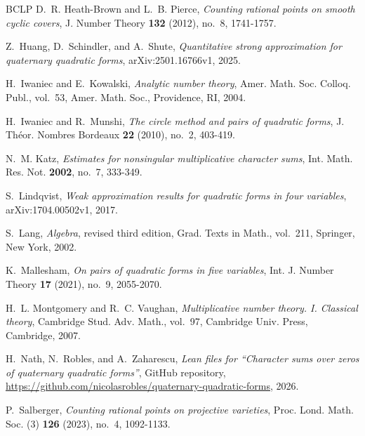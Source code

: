 \documentclass[11pt]{amsart}
\numberwithin{equation}{section}
\numberwithin{figure}{section}
\theoremstyle{definition}
\begin{document}
\begin{thebibliography}{BCLP}
D.~R. Heath-Brown and L.~B. Pierce,
\emph{Counting rational points on smooth cyclic covers},
J. Number Theory \textbf{132} (2012), no.~8, 1741-1757.

Z.~Huang, D.~Schindler, and A.~Shute,
\emph{Quantitative strong approximation for quaternary quadratic forms},
arXiv:2501.16766v1, 2025.

H.~Iwaniec and E.~Kowalski,
\emph{Analytic number theory},
Amer. Math. Soc. Colloq. Publ., vol.~53, Amer. Math. Soc., Providence, RI, 2004.

H.~Iwaniec and R.~Munshi,
\emph{The circle method and pairs of quadratic forms},
J. Th\'eor. Nombres Bordeaux \textbf{22} (2010), no.~2, 403-419.

N.~M. Katz,
\emph{Estimates for nonsingular multiplicative character sums},
Int. Math. Res. Not. \textbf{2002}, no.~7, 333-349.

S.~Lindqvist,
\emph{Weak approximation results for quadratic forms in four variables},
arXiv:1704.00502v1, 2017.

S.~Lang,
\emph{Algebra},
revised third edition, Grad. Texts in Math., vol.~211, Springer, New York, 2002.

K.~Mallesham,
\emph{On pairs of quadratic forms in five variables},
Int. J. Number Theory \textbf{17} (2021), no.~9, 2055-2070.

H.~L. Montgomery and R.~C. Vaughan,
\emph{Multiplicative number theory. I. Classical theory},
Cambridge Stud. Adv. Math., vol.~97, Cambridge Univ. Press, Cambridge, 2007.

H.~Nath, N.~Robles, and A.~Zaharescu,
\emph{Lean files for ``Character sums over zeros of quaternary quadratic forms''},
GitHub repository, \url{https://github.com/nicolasrobles/quaternary-quadratic-forms}, 2026.

P.~Salberger,
\emph{Counting rational points on projective varieties},
Proc. Lond. Math. Soc. (3) \textbf{126} (2023), no.~4, 1092-1133.

\end{thebibliography}
\end{document}
